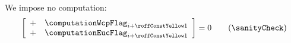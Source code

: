 We impose no computation:
\[
	\left[ \begin{array}{cl}
		+ & \computationWcpFlag _{i + \sysiNoopComputationRowOffset} \\
		+ & \computationEucFlag _{i + \sysiNoopComputationRowOffset} \\
	\end{array} \right]
	= 0
	\qquad (\sanityCheck)
\]
